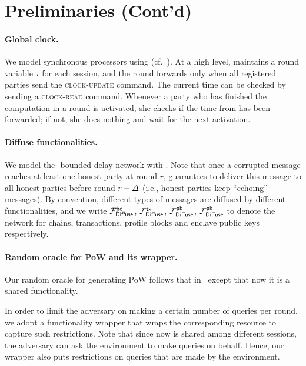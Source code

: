 \section{Preliminaries (Cont'd)}
\label{sec:preliminaries-contd}

\paragraph{Global clock.}
%
We model synchronous processors using \funcClock (cf.~\cite{TCC:KMTZ13}).
%
At a high level, \funcClock maintains a round variable $\tau$ for each session, and the round forwards only when all registered parties send \funcClock the \textsc{clock-update} command.
%
The current time can be checked by sending a \textsc{clock-read} command.
%
Whenever a party who has finished the computation in a round is activated, she checks if the time from \funcClock has been forwarded; if not, she does nothing and wait for the next activation.



\paragraph{Diffuse functionalities.}
%
We model the \delay-bounded delay network with \funcDiffuse \cite{C:BMTZ17}.
%
Note that once a corrupted message reaches at least one honest party at round $r$, \funcDiffuse guarantees to deliver this message to all honest parties before round $r + \varDelta$ (i.e., honest parties keep ``echoing'' messages).
%
By convention, different types of messages are diffused by different functionalities, and we write $\mathcal{F}_{\mathsf{Diffuse}}^{\mathsf{bc}}$, $\mathcal{F}_{\mathsf{Diffuse}}^{\mathsf{tx}}$, $\mathcal{F}_{\mathsf{Diffuse}}^{\mathsf{pb}}$, $\mathcal{F}_{\mathsf{Diffuse}}^\mathsf{pk}$ to denote the network for chains, transactions, profile blocks and enclave public keys respectively.



\paragraph{Random oracle for PoW and its wrapper.}
%
Our random oracle for generating PoW follows that in~\cite{C:BMTZ17} except that now it is a shared functionality.



In order to limit the adversary on making a certain number of queries per round, we adopt a functionality wrapper \cite{C:BMTZ17} that wraps the corresponding resource to capture such restrictions.
%
Note that since now \funcGRO is shared among different sessions, the adversary can ask the environment to make queries on behalf.
%
Hence, our wrapper \wrapper{\funcGRO} also puts restrictions on queries that are made by the environment.

